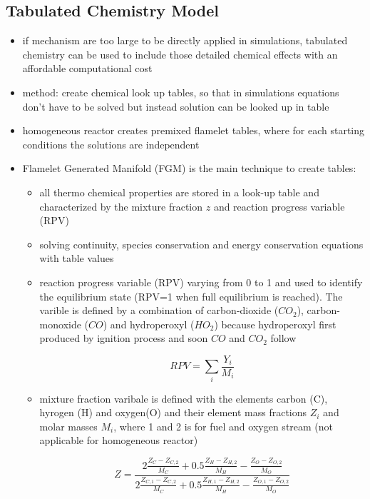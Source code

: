 \documentclass[12pt,oneside,a4paper,english]{article}
\begin{document}
\subsection{Tabulated Chemistry Model} %
\begin{itemize}
\item{if mechanism are too large to be directly applied in simulations, tabulated chemistry can be used to include those detailed chemical effects with an affordable computational cost}
\item{method: create chemical look up tables, so that in simulations equations don't have to be solved but instead solution can be looked up in table}
\item{homogeneous reactor creates premixed flamelet tables, where for each starting conditions the solutions are independent}
\item{Flamelet Generated Manifold (FGM) is the main technique to create tables:}

	\begin{itemize}
	\item{all thermo chemical properties are stored in a look-up table and characterized by the mixture fraction $z$ and reaction progress variable (RPV) \cite{Bekdemir2013}}
	\item{solving  continuity,  species  conservation  and  energy  conservation  equations with table values}
	\item{reaction  progress  variable  (RPV)  varying  from  0  to  1  and used to identify the equilibrium state (RPV=1 when full equilibrium is reached). The varible is defined by a combination of carbon-dioxide ($CO_2$), carbon-monoxide ($CO$) and hydroperoxyl ($HO_2$) because hydroperoxyl first produced by ignition process and soon $CO$ and $CO_2$ follow}
	
	\begin{equation}
	RPV = \sum_i \frac{Y_i}{M_i}
	\end{equation}
	
	\item{mixture fraction varibale is defined with the elements carbon (C), hyrogen (H) and oxygen(O) and their element mass fractions $Z_i$ and molar masses $M_i$, where 1 and 2 is for fuel and oxygen stream (not applicable for homogeneous reactor)}
	
	\begin{equation}
	Z = \frac{2\frac{Z_C-Z_{C,2}}{M_C}+0.5\frac{Z_H-Z_{H,2}}{M_H}-\frac{Z_O-Z_{O,2}}{M_O}}{2\frac{Z_{C,1}-Z_{C,2}}{M_C}+0.5\frac{Z_{H,1}-Z_{H,2}}{M_H}-\frac{Z_{O,1}-Z_{O,2}}{M_O}}
	\end{equation}
	
	\end{itemize}

\end{itemize}
\end{document}
